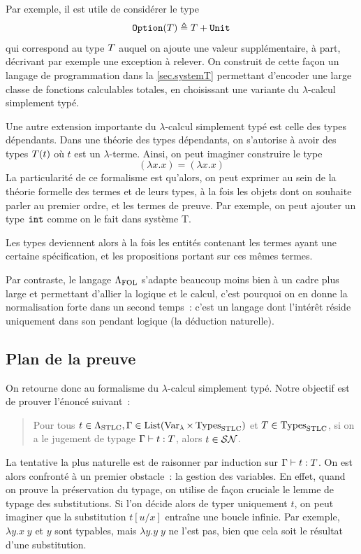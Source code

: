 Par exemple, il est utile de considérer le type
\[{\normalfont\texttt{Option}}(T)\triangleq T + {\normalfont\texttt{Unit}}\]
qui correspond au type $T$ auquel on ajoute une valeur supplémentaire, à
part, décrivant par exemple une exception à relever. On construit de cette
façon un langage de programmation dans la \cref{sec.systemT} permettant
d'encoder une large classe de fonctions calculables totales, en choisissant une
variante du $\lambda$-calcul simplement typé.

Une autre extension importante du $\lambda$-calcul simplement typé est celle des
types dépendants. Dans une théorie des types dépendants, on s'autorise à avoir
des types $T(t)$ où $t$ est un $\lambda$-terme. Ainsi, on peut imaginer
construire le type
\[(\lambda x.x) = (\lambda x.x)\]
La particularité de ce formalisme est qu'alors, on peut exprimer au sein de la
théorie formelle des termes et de leurs types, à la fois les objets dont on
souhaite parler au premier ordre, et les termes de preuve.
Par exemple, on peut ajouter un type ${\normalfont\texttt{int}}$ comme on le fait dans système T.

Les types deviennent alors à la fois les entités contenant les termes ayant une
certaine spécification, et les propositions portant sur ces mêmes termes.

Par contraste, le langage $\Lambda_{\mathrm{FOL}}$ s'adapte beaucoup moins bien à un cadre
plus large et permettant d'allier la logique et le calcul, c'est pourquoi on
en donne la normalisation forte dans un second temps~: c'est un langage dont
l'intérêt réside uniquement dans son pendant logique (la déduction naturelle).

\subsection{Plan de la preuve}

On retourne donc au formalisme du $\lambda$-calcul simplement typé. Notre
objectif est de prouver l'énoncé suivant~:
\begin{quotation}
  \noindent
  Pour tous $t \in \Lambda_{\mathrm{STLC}}, \Gamma\in\operatorname{List}(\operatorname{Var}_{\lambda}\times\operatorname{Types}_{\mathrm{STLC}})$ et
  $T \in \operatorname{Types}_{\mathrm{STLC}}$, si on a le jugement de typage
  $\Gamma\mathrel{\vdash} t : T$, alors $t \in \mathcal{SN}$.
\end{quotation}

La tentative la plus naturelle est de raisonner par induction sur
$\Gamma\mathrel{\vdash} t : T$. On est alors confronté à un premier obstacle~: la
gestion des variables. En effet, quand on prouve la préservation du typage, on
utilise de façon cruciale le lemme de typage des substitutions. Si l'on
décide alors de typer uniquement $t$, on peut imaginer que la substitution
$t[u/x]$ entraîne une boucle infinie. Par exemple, $\lambda y.x\;y$ et
$y$ sont typables, mais $\lambda y.y\;y$ ne l'est pas, bien que cela soit le
résultat d'une substitution.

